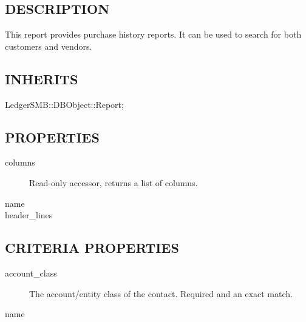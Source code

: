 \begin{description}
\begin{description}
\begin{description}
\begin{description}
\begin{description}
\begin{description}
\begin{description}
\begin{description}
\begin{description}
\begin{description}
\subsection*{DESCRIPTION\label{LedgerSMB::DBObject::Report::Contact::History_DESCRIPTION}}


This report provides purchase history reports.  It can be used to search for 
both customers and vendors.

\subsection*{INHERITS\label{LedgerSMB::DBObject::Report::Contact::History_INHERITS}}
\begin{description}

\item[{LedgerSMB::DBObject::Report;}] \mbox{}\end{description}
\subsection*{PROPERTIES\label{LedgerSMB::DBObject::Report::Contact::History_PROPERTIES}}
\begin{description}

\item[{columns}] \mbox{}

Read-only accessor, returns a list of columns.


\item[{name}] \mbox{}
\item[{header\_lines}] \mbox{}\end{description}
\subsection*{CRITERIA PROPERTIES\label{LedgerSMB::DBObject::Report::Contact::History_CRITERIA_PROPERTIES}}
\begin{description}

\item[{account\_class}] \mbox{}

The account/entity class of the contact.  Required and an exact match.


\item[{name}] \mbox{}


\end{description}
\end{description}
\end{description}
\end{description}
\end{description}
\end{description}
\end{description}
\end{description}
\end{description}
\end{description}
\end{description}
